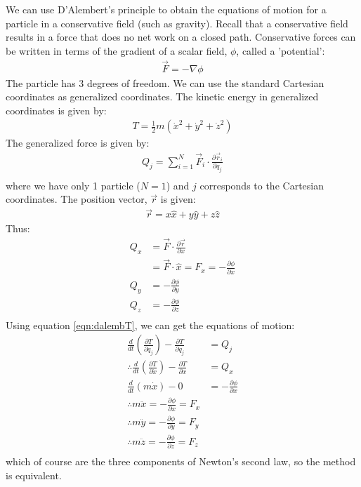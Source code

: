 \begin{example}{0pt}{We can use D'Alembert's principle to obtain the equations of motion for a particle in a conservative field (such as gravity).}{}
Recall that a conservative field results in a force that does no net work on a closed path. Conservative forces can be written in terms of the gradient of a scalar field, $\phi$, called a 'potential':
\begin{align*}
\vec{F}=-\nabla\phi
\end{align*}
The particle has 3 degrees of freedom. We can use the standard Cartesian coordinates as generalized coordinates. The kinetic energy in generalized coordinates is given by:
\begin{align*}
T=\frac{1}{2}m(\dot{x}^2+\dot{y}^2+\dot{z}^2)
\end{align*}
The generalized force is given by:
\begin{align*}
Q_j=\sum_{i=1}^N\vec{F}_i\cdot\frac{\partial\vec{r}_i}{\partial q_j}\nonumber\\
\end{align*}
where we have only 1 particle ($N=1$) and $j$ corresponds to the Cartesian coordinates. The position vector, $\vec{r}$ is given:
\begin{align*}
\vec{r}=x\hat{x}+y\hat{y}+z\hat{z}
\end{align*}
Thus:
\begin{align*}
Q_x&=\vec{F}\cdot\frac{\partial\vec{r}}{\partial x}\nonumber\\
&=\vec{F}\cdot\hat{x}=F_x=-\frac{\partial \phi}{\partial x}\nonumber\\
Q_y&=-\frac{\partial \phi}{\partial y}\nonumber\\
Q_z&=-\frac{\partial \phi}{\partial z}\nonumber\\
\end{align*}
Using equation \ref{eqn:dalembT}, we can get the equations of motion:
\begin{align*}
\frac{d}{dt}\left(\frac{\partial T}{\partial \dot{q}_j} \right) - \frac{\partial T}{\partial q_j}&=Q_j\nonumber\\
\therefore \frac{d}{dt}\left(\frac{\partial T}{\partial \dot{x}} \right) - \frac{\partial T}{\partial x}&=Q_x\nonumber\\
\frac{d}{dt}\left(m\dot{x} \right) - 0&=-\frac{\partial \phi}{\partial x}\nonumber\\
\therefore m\ddot{x}=-\frac{\partial \phi}{\partial x}=F_x\nonumber\\
\therefore m\ddot{y}=-\frac{\partial \phi}{\partial y}=F_y\nonumber\\
\therefore m\ddot{z}=-\frac{\partial \phi}{\partial z}=F_z\nonumber\\
\end{align*}
which of course are the three components of Newton's second law, so the method is equivalent.


\end{example}
